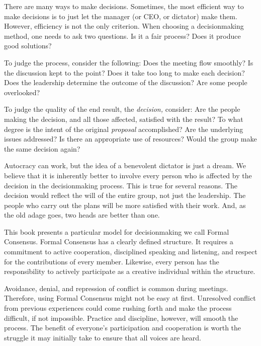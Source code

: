 There are many ways to make decisions. Sometimes, the most
efficient way to make decisions is to just let the manager
(or CEO, or dictator) make them. However, efficiency is not the
only criterion. When choosing a decisionmaking method, one needs to
ask two questions. Is it a fair process? Does it produce good
solutions?

To judge the process, consider the following: Does the meeting
flow smoothly? Is the discussion kept to the point? Does it take
too long to make each decision? Does the leadership determine the
outcome of the discussion? Are some people overlooked?

To judge the quality of the end result, the \emph{decision,}
consider: Are the people making the decision, and all those
affected, satisfied with the result? To what degree is the intent
of the original \emph{proposal} accomplished? Are the underlying
issues addressed? Is there an appropriate use of resources? Would
the group make the same decision again?

Autocracy can work, but the idea of a benevolent dictator is just
a dream. We believe that it is inherently better to involve every
person who is affected by the decision in the decisionmaking
process. This is true for several reasons. The decision would
reflect the will of the entire group, not just the leadership. The
people who carry out the plans will be more satisfied with their
work. And, as the old adage goes, two heads are better than one.

This book presents a particular model for decisionmaking we call
Formal Consensus. Formal Consensus has a clearly defined
structure. It requires a commitment to active cooperation,
disciplined speaking and listening, and respect for the
contributions of every member. Likewise, every person has the
responsibility to actively participate as a creative
individual within the structure.

Avoidance, denial, and repression of conflict is common during
meetings.  Therefore, using Formal Consensus might not be easy at
first. Unresolved conflict from previous experiences could come
rushing forth and make the process difficult, if not
impossible. Practice and discipline, however, will smooth the
process. The benefit of everyone's participation and cooperation is
worth the struggle it may initially take to ensure that all voices
are heard.

